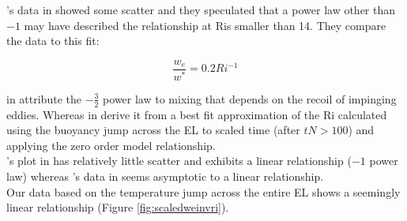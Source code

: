 \citeauthor{SullMoengStev}'s data in \cite{SullMoengStev} showed some scatter and they speculated that a power law other than $-1$ may have described the relationship at \acs{Ri}s smaller than 14.  They compare the data to this fit:

\begin{equation}
\frac{w_{e}}{w^{*}}=0.2 Ri^{-1}
\end{equation}

\citeauthor{Turner86} in \cite{Turner86} attribute the $-\frac{3}{2}$ power law to mixing that depends on the recoil of impinging eddies.  Whereas \citeauthor{FedConzMir04} in \cite{FedConzMir04} derive it from a best fit approximation of the \acs{Ri} calculated using the buoyancy jump across the \acs{EL} to scaled time (after $tN>100$) and applying the zero order model relationship.\\

\citeauthor{BrooksFowler2}'s plot in \cite{BrooksFowler2} has relatively little scatter and exhibits a linear relationship ($-1$ power law) whereas \citeauthor{GarciaMellado}'s data in \cite{GarciaMellado} seems asymptotic to a linear relationship.\\

Our data based on the temperature jump across the entire \acs{EL} shows a seemingly linear relationship (Figure \ref{fig:scaledweinvri}). 



\endinput

Any text after an \endinput is ignored.
You could put scraps here or things in progress.
